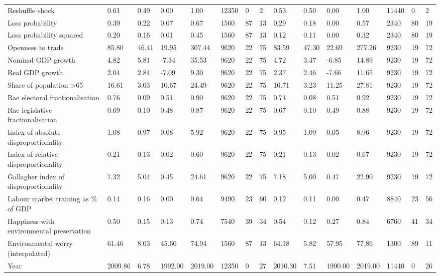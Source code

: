 \begin{longtable}{lllllllllllllll}
Reshuffle shock & 0.61 & 0.49 & 0.00 & 1.00 & 12350 & 0 & 2 & 0.53 & 0.50 & 0.00 & 1.00 & 11440 & 0 & 2\\
Loss probability & 0.39 & 0.22 & 0.07 & 0.67 & 1560 & 87 & 13 & 0.29 & 0.18 & 0.00 & 0.57 & 2340 & 80 & 19\\
\addlinespace
Loss probability squared & 0.20 & 0.16 & 0.01 & 0.45 & 1560 & 87 & 13 & 0.12 & 0.11 & 0.00 & 0.32 & 2340 & 80 & 19\\
Openness to trade & 85.80 & 46.41 & 19.95 & 307.44 & 9620 & 22 & 75 & 83.59 & 47.30 & 22.69 & 277.26 & 9230 & 19 & 72\\
Nominal GDP growth & 4.82 & 5.81 & -7.34 & 35.53 & 9620 & 22 & 75 & 4.72 & 3.47 & -6.85 & 14.89 & 9230 & 19 & 72\\
Real GDP growth & 2.04 & 2.84 & -7.09 & 9.30 & 9620 & 22 & 75 & 2.37 & 2.46 & -7.66 & 11.65 & 9230 & 19 & 72\\
Share of population >65 & 16.61 & 3.03 & 10.67 & 24.49 & 9620 & 22 & 75 & 16.71 & 3.23 & 11.25 & 27.81 & 9230 & 19 & 72\\
\addlinespace
Rae electoral fractionalisation & 0.76 & 0.09 & 0.51 & 0.90 & 9620 & 22 & 75 & 0.74 & 0.08 & 0.51 & 0.92 & 9230 & 19 & 72\\
Rae legislative fractionalisation & 0.69 & 0.10 & 0.48 & 0.87 & 9620 & 22 & 75 & 0.67 & 0.10 & 0.49 & 0.88 & 9230 & 19 & 72\\
Index of absolute disproportionality & 1.08 & 0.97 & 0.08 & 5.92 & 9620 & 22 & 75 & 0.95 & 1.09 & 0.05 & 8.96 & 9230 & 19 & 72\\
Index of relative disproportionality & 0.21 & 0.13 & 0.02 & 0.60 & 9620 & 22 & 75 & 0.21 & 0.13 & 0.02 & 0.67 & 9230 & 19 & 72\\
Gallagher index of disproportionality & 7.32 & 5.04 & 0.45 & 24.61 & 9620 & 22 & 75 & 7.18 & 5.00 & 0.47 & 22.90 & 9230 & 19 & 72\\
\addlinespace
Labour market training as \% of GDP & 0.14 & 0.16 & 0.00 & 0.64 & 9490 & 23 & 60 & 0.12 & 0.11 & 0.00 & 0.47 & 8840 & 23 & 56\\
Happiness with environmental preservation & 0.50 & 0.15 & 0.13 & 0.74 & 7540 & 39 & 34 & 0.54 & 0.12 & 0.27 & 0.84 & 6760 & 41 & 34\\
Environmental worry (interpolated) & 61.46 & 8.03 & 45.60 & 74.94 & 1560 & 87 & 13 & 64.18 & 5.82 & 57.95 & 77.86 & 1300 & 89 & 11\\
Year & 2009.86 & 6.78 & 1992.00 & 2019.00 & 12350 & 0 & 27 & 2010.30 & 7.51 & 1990.00 & 2019.00 & 11440 & 0 & 26\\
\bottomrule
\end{longtable}
